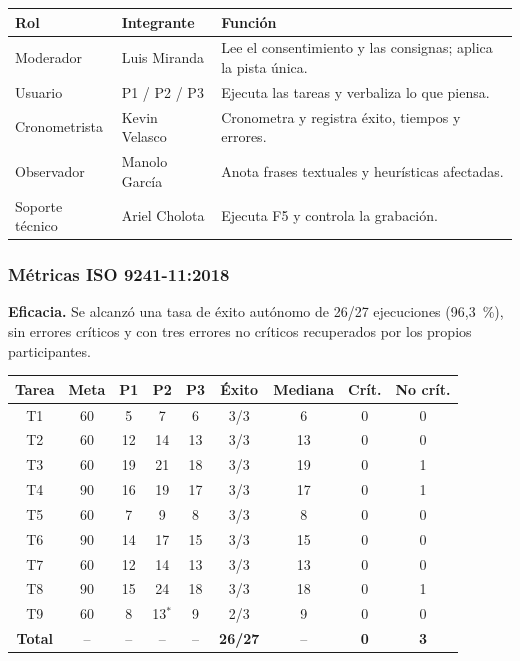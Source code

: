 \documentclass{article}
\begin{document}
\begin{center}
\small
\begin{tabular}{|p{3.2cm}|p{3.4cm}|p{8.4cm}|}
\hline
\textbf{Rol} & \textbf{Integrante} & \textbf{Función} \\
\hline
Moderador & Luis Miranda & Lee el consentimiento y las consignas; aplica la pista única. \\
\hline
Usuario & P1 / P2 / P3 & Ejecuta las tareas y verbaliza lo que piensa. \\
\hline
Cronometrista & Kevin Velasco & Cronometra y registra éxito, tiempos y errores. \\
\hline
Observador & Manolo García & Anota frases textuales y heurísticas afectadas. \\
\hline
Soporte técnico & Ariel Cholota & Ejecuta F5 y controla la grabación. \\
\hline
\end{tabular}
\end{center}

\subsubsection{Métricas ISO 9241-11:2018}
\textbf{Eficacia.} Se alcanzó una tasa de éxito autónomo de 26/27 ejecuciones (96,3~\%), sin errores críticos y con tres errores no críticos recuperados por los propios participantes.

\begin{center}
\scriptsize
\begin{tabular}{|c|c|c|c|c|c|c|c|c|}
\hline
\textbf{Tarea} & \textbf{Meta} & \textbf{P1} & \textbf{P2} & \textbf{P3} & \textbf{Éxito} & \textbf{Mediana} & \textbf{Crít.} & \textbf{No crít.} \\
\hline
T1 & 60 & 5 & 7 & 6 & 3/3 & 6 & 0 & 0 \\
\hline
T2 & 60 & 12 & 14 & 13 & 3/3 & 13 & 0 & 0 \\
\hline
T3 & 60 & 19 & 21 & 18 & 3/3 & 19 & 0 & 1 \\
\hline
T4 & 90 & 16 & 19 & 17 & 3/3 & 17 & 0 & 1 \\
\hline
T5 & 60 & 7 & 9 & 8 & 3/3 & 8 & 0 & 0 \\
\hline
T6 & 90 & 14 & 17 & 15 & 3/3 & 15 & 0 & 0 \\
\hline
T7 & 60 & 12 & 14 & 13 & 3/3 & 13 & 0 & 0 \\
\hline
T8 & 90 & 15 & 24 & 18 & 3/3 & 18 & 0 & 1 \\
\hline
T9 & 60 & 8 & 13$^{*}$ & 9 & 2/3 & 9 & 0 & 0 \\
\hline
\textbf{Total} & -- & -- & -- & -- & \textbf{26/27} & -- & \textbf{0} & \textbf{3} \\
\hline
\end{tabular}
\end{center}
\end{document}
